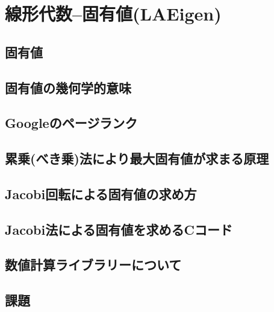 \documentclass[10pt,a4j]{jreport}
\begin{document}
\chapter{線形代数--固有値(LAEigen)}
\section{固有値}

\section{固有値の幾何学的意味}

\section{Googleのページランク}

\section{累乗(べき乗)法により最大固有値が求まる原理}

\section{Jacobi回転による固有値の求め方}

\section{Jacobi法による固有値を求めるCコード}

\section{数値計算ライブラリーについて}

\section{課題}

\end{document}
